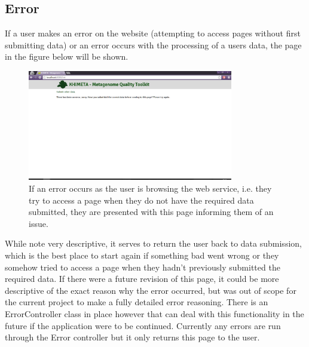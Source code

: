 \subsection{Error}
If a user makes an error on the website (attempting to access pages without first submitting data) or an error occurs with the processing of a users data, the page in the figure below will be shown.
\begin{figure}[H]
	\centering
\includegraphics[width=0.8\textwidth]{images/ui10}
\caption{If an error occurs as the user is browsing the web service, i.e. they try to access a page when they do not have the required data submitted, they are presented with this page informing them of an issue.}
\end{figure}
While note very descriptive, it serves to return the user back to data submission, which is the best place to start again if something bad went wrong or they somehow tried to access a page when they hadn't previously submitted the required data. If there were a future revision of this page, it could be more descriptive of the exact reason why the error occurred, but was out of scope for the current project to make a fully detailed error reasoning. There is an ErrorController class in place however that can deal with this functionality in the future if the application were to be continued. Currently any errors are run through the Error controller but it only returns this page to the user.


